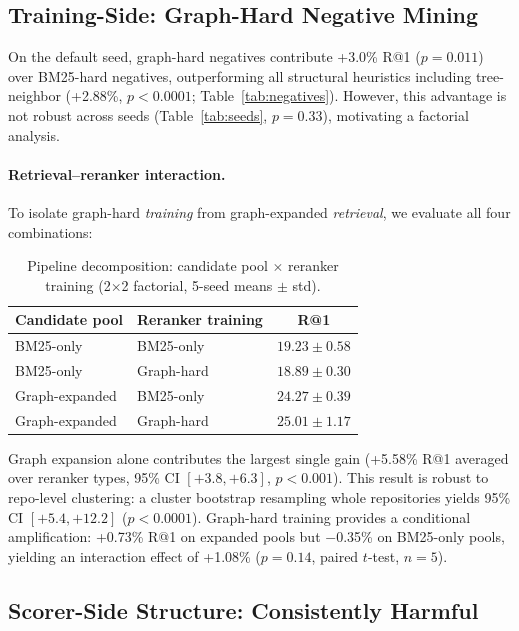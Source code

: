 \documentclass{article}
\begin{document}
\subsection{Training-Side: Graph-Hard Negative Mining}
\label{app:neg_ablation}

On the default seed, graph-hard negatives contribute +3.0\% R@1 ($p = 0.011$) over BM25-hard negatives, outperforming all structural heuristics including tree-neighbor (+2.88\%, $p < 0.0001$; Table~\ref{tab:negatives}).
However, this advantage is not robust across seeds (Table~\ref{tab:seeds}, $p = 0.33$), motivating a factorial analysis.

\paragraph{Retrieval--reranker interaction.}
To isolate graph-hard \emph{training} from graph-expanded \emph{retrieval}, we evaluate all four combinations:

\begin{table}[h]
\centering
\caption{Pipeline decomposition: candidate pool $\times$ reranker training (2$\times$2 factorial, 5-seed means $\pm$ std).}
\label{tab:interaction}
\small
\begin{tabular}{llc}
\toprule
\textbf{Candidate pool} & \textbf{Reranker training} & \textbf{R@1} \\
\midrule
BM25-only & BM25-only & $19.23 \pm 0.58$ \\
BM25-only & Graph-hard   & $18.89 \pm 0.30$ \\
Graph-expanded & BM25-only & $24.27 \pm 0.39$ \\
Graph-expanded & Graph-hard & $\mathbf{25.01 \pm 1.17}$ \\
\bottomrule
\end{tabular}
\end{table}

Graph expansion alone contributes the largest single gain (+5.58\% R@1 averaged over reranker types, 95\% CI $[+3.8, +6.3]$, $p < 0.001$).
This result is robust to repo-level clustering: a cluster bootstrap resampling whole repositories yields 95\% CI $[+5.4, +12.2]$ ($p < 0.0001$).
Graph-hard training provides a conditional amplification: +0.73\% R@1 on expanded pools but $-$0.35\% on BM25-only pools, yielding an interaction effect of +1.08\% ($p = 0.14$, paired $t$-test, $n = 5$).

\subsection{Scorer-Side Structure: Consistently Harmful}
\label{app:structure_analysis}
\end{document}
